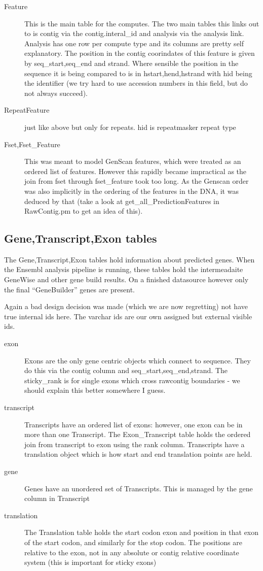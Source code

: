 \documentclass[11pt,a4paper]{article}
\begin{document}
\begin{description}
\item[Feature] This is the main table for the computes. The two main tables this
links out to is contig via the contig.interal\_id and analysis via the analysis
link. Analysis has one row per compute type and its columns are pretty self
explanatory. The position in the contig coorindates of this feature is given
by seq\_start,seq\_end and strand. Where sensible the position in the sequence
it is being compared to is in hstart,hend,hstrand with hid being the identifier
(we try hard to use accession numbers in this field, but do not always succeed).
\item[RepeatFeature] just like above but only for repeats. hid is repeatmasker repeat
type
\item[Fset,Fset\_Feature] This was meant to model GenScan features,
which were treated as an ordered list of features. However this
rapidly became impractical as the join from fset through fset\_feature
took too long. As the Genscan order was also implicitly in the
ordering of the features in the DNA, it was deduced by that (take a look
at get\_all\_PredictionFeatures in RawContig.pm to get an idea of this). 
\end{description}

\subsection{Gene,Transcript,Exon tables}

The Gene,Transcript,Exon tables hold information about predicted genes. When the
Ensembl analysis pipeline is running, these tables hold the intermeadaite 
GeneWise and other gene build results. On a finished datasource however only
the final ``GeneBuilder'' genes are present.

Again a bad design decision was made (which we are now regretting) not have true
internal ids here. The varchar ids are our own assigned but external visible ids.

\begin{description}
\item[exon] Exons are the only gene centric objects which connect to
sequence.  They do this via the contig column and
seq\_start,seq\_end,strand. The sticky\_rank is for single exons which
cross rawcontig boundaries - we should explain this better somewhere 
I guess.
\item[transcript] Transcripts have an ordered list of exons: however, one
exon can be in more than one Transcript. The Exon\_Transcript table holds
the ordered join from transcript to exon using the rank column. Transcripts
have a translation object which is how start and end translation points
are held.
\item[gene] Genes have an unordered set of Transcripts. This is managed by
the gene column in Transcript
\item[translation] The Translation table holds the start codon exon and
position in that exon of the start codon, and similarly for the stop codon.
The positions are relative to the exon, not in any absolute or contig relative
coordinate system (this is important for sticky exons)
\end{description}
\end{document}
